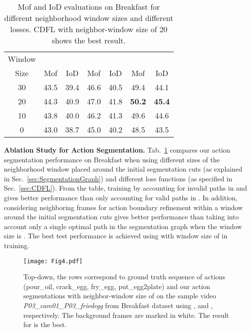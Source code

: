 \documentclass[10pt,twocolumn,letterpaper]{article}
\begin{document}
\begin{table}
\begin{center}
\begin{tabular}{|c|c|c|c|c|c|c|}
\cline{1-7}
Window & \multicolumn{2}{c|}{}&\multicolumn{2}{c|}{}&\multicolumn{2}{c|}{}\\
\cline{2-7}
Size & Mof & IoD & Mof & IoD & Mof & IoD \\
\hline 
30 & 43.5 & 39.4 & 46.6 & 40.5 & 49.4 & 44.1 \\
\hline 
20 & 44.3 & 40.9 & 47.0 & 41.8 & {\bf 50.2} & {\bf 45.4} \\
\hline 
10 & 43.8 & 40.0 & 46.2 & 41.3 & 49.6 & 44.6\\
\hline 
0 & 43.0 & 38.7 & 45.0 & 40.2 & 48.5 & 43.5\\
\hline
\end{tabular}
\end{center}
\caption{Mof and IoD evaluations on Breakfast for different neighborhood window sizes and different losses. CDFL with neighbor-window size of 20 shows the best result.}
\label{table:Different Training Strategies}
\end{table}


{\bf  Ablation Study for Action Segmentation.} Tab.~\ref{table:Different Training Strategies} compares our action segmentation performance on Breakfast when using different sizes of the neighborhood window placed around the initial segmentation cuts (as explained in Sec.~\ref{sec:SegmentationGraph}) and different loss functions (as specified in Sec.~\ref{sec:CDFL}). From the table, training by accounting for invalid paths in  and  gives better performance than only accounting for valid paths in . In addition, considering neighboring frames for action boundary refinement within a window around the initial segmentation cuts gives better performance than taking into account only a single optimal path in the segmentation graph when the window size is . The best test performance is achieved using  with window size of  in training.

\begin{figure}
\centering
\texttt{[image: Fig4.pdf]}
\caption{Top-down, the rows
correspond to ground truth sequence of actions (\textcolor{mygold}{pour\_oil}, \textcolor{mymaroon}{crack\_egg}, \textcolor{mygreen}{fry\_egg}, \textcolor{myaquamarine}{put\_egg2plate}) and our action segmentations with neighbor-window size of  on the sample video \textit{P03\_cam01\_P03\_friedegg} from Breakfast dataset using ,  and , respectively. The background frames are marked in white. The result for  is the best.}
\label{fig:diff_strategies}
\end{figure}
\end{document}
